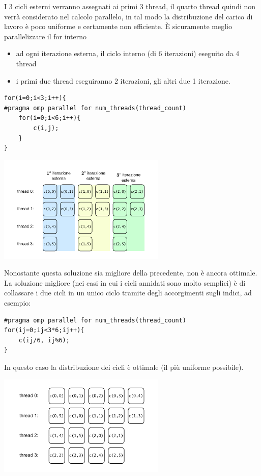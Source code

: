 \documentclass[10pt, letterpaper]{report}
\begin{document}
I 3 cicli esterni verranno assegnati ai primi 3 thread, il quarto thread quindi non verrà considerato nel calcolo parallelo, in tal modo la distribuzione del carico di lavoro è poco uniforme e certamente non efficiente. È sicuramente meglio parallelizzare il for interno\begin{itemize}
    \item ad ogni iterazione esterna, il ciclo interno (di 6 iterazioni) eseguito da 4 thread \item i primi due thread eseguiranno 2 iterazioni, gli altri due 1 iterazione.
\end{itemize}
\begin{lstlisting}[style=CStyle]
for(i=0;i<3;i++){
#pragma omp parallel for num_threads(thread_count) 
    for(i=0;i<6;i++){
        c(i,j);
    }
}
\end{lstlisting}
\begin{center}
    \includegraphics[width=0.6\textwidth ]{images/cicliAnnidati3.drawio.pdf}
\end{center}
Nonostante questa soluzione sia migliore della precedente, non è ancora ottimale. La soluzione migliore (nei casi in cui i cicli annidati sono molto semplici) è di collassare i due cicli in un unico ciclo tramite degli accorgimenti sugli indici, ad esempio:
\begin{lstlisting}[style=CStyle]
#pragma omp parallel for num_threads(thread_count) 
for(ij=0;ij<3*6;ij++){
    c(ij/6, ij%6);
}
\end{lstlisting}
In questo caso la distribuzione dei cicli è ottimale (il più uniforme possibile).
\begin{center}
    \includegraphics[width=0.6\textwidth ]{images/cicliAnnidati4.pdf}
\end{center}
\end{document}
